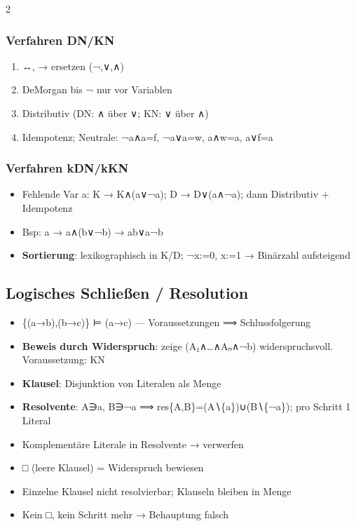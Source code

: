 \documentclass[10pt, a4paper]{article}
\begin{document}
\begin{multicols}{2}
\subsubsection{Verfahren DN/KN}
\begin{enumerate}
  \item ↔, → ersetzen (¬,∨,∧)
  \item DeMorgan bis ¬ nur vor Variablen
  \item Distributiv (DN: ∧ über ∨; KN: ∨ über ∧)
  \item Idempotenz; Neutrale: ¬a∧a=f, ¬a∨a=w, a∧w=a, a∨f=a
\end{enumerate}


\subsubsection{Verfahren kDN/kKN}
\begin{itemize}
  \item Fehlende Var a: K → K∧(a∨¬a); D → D∨(a∧¬a); dann Distributiv + Idempotenz
  \item Bsp: a → a∧(b∨¬b) → ab∨a¬b
  \item \textbf{Sortierung}: lexikographisch in K/D; ¬x:=0, x:=1 → Binärzahl aufsteigend
\end{itemize}


\subsection{Logisches Schließen / Resolution}
\begin{itemize}
  \item \{(a→b),(b→c)\} ⊨ (a→c) — Voraussetzungen ⟹ Schlussfolgerung
  \item \textbf{Beweis durch Widerspruch}: zeige (A₁∧…∧Aₙ∧¬b) widerspruchsvoll. Voraussetzung: KN
  \item \textbf{Klausel}: Disjunktion von Literalen als Menge
  \item \textbf{Resolvente}: A∋a, B∋¬a ⟹ res\{A,B\}=(A∖\{a\})∪(B∖\{¬a\}); pro Schritt 1 Literal
  \item Komplementäre Literale in Resolvente → verwerfen
  \item \textbf{□} (leere Klausel) = Widerspruch bewiesen
  \item Einzelne Klausel nicht resolvierbar; Klauseln bleiben in Menge
  \item Kein □, kein Schritt mehr → Behauptung falsch
\end{itemize}


\end{multicols}
\end{document}
